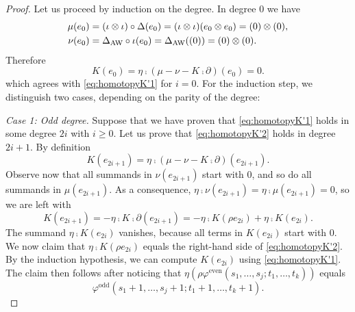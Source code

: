 \begin{proof}
	Let us proceed by induction on the degree. In degree $0$ we have
	\begin{align*}
		\mu(e_0) &= (\iota\otimes \iota)\circ \Delta(e_0) = (\iota\otimes \iota)(e_0\otimes e_0) = (0)\otimes (0),\\
		\nu(e_0) &= \Delta_{\operatorname{AW}}\circ \iota(e_0) = \Delta_{\operatorname{AW}}((0)) = (0)\otimes (0).
	\end{align*}
	Therefore
	\[
	K(e_0) = \eta \comp (\mu-\nu-K \comp \partial)(e_0) = 0.
	\]
	which agrees with \eqref{eq:homotopyK'1} for $i=0$. For the induction step, we distinguish two cases, depending on the parity of the degree:

	\medskip\noindent\emph{Case 1: Odd degree.}
	Suppose that we have proven that \eqref{eq:homotopyK'1} holds in some degree $2i$ with $i\geq 0$. Let us prove that \eqref{eq:homotopyK'2} holds in degree $2i+1$. By definition
	\[K(e_{2i+1}) = \eta \comp (\mu-\nu-K \comp \partial)(e_{2i+1}).\]
	Observe now that all summands in $\nu(e_{2i+1})$ start with $0$, and so do all summands in $\mu(e_{2i+1})$. As a consequence, $\eta \comp \nu(e_{2i+1}) = \eta \comp \mu(e_{2i+1}) = 0$, so we are left with
	\[K(e_{2i+1}) = -\eta \comp K \comp \partial(e_{2i+1}) = -\eta \comp K (\rho e_{2i}) + \eta \comp K (e_{2i}).
	\]
	The summand $\eta \comp K (e_{2i})$ vanishes, because all terms in $K(e_{2i})$ start with $0$. We now claim that $\eta \comp K (\rho e_{2i})$ equals the right-hand side of \eqref{eq:homotopyK'2}. By the induction hypothesis, we can compute $K(e_{2i})$ using \eqref{eq:homotopyK'1}. The claim then follows after noticing that $\eta(\rho\varphi^{\mathrm{even}}(s_1,\ldots,s_j;t_1,\ldots,t_k))$ equals
	\[
	\varphi^{\mathrm{odd}}(s_1+1,\ldots,s_j+1;t_1+1,\ldots,t_k+1).
	\]


\end{proof}
